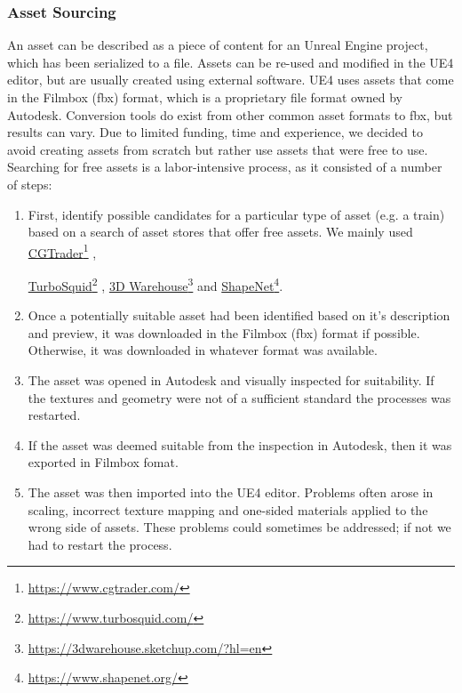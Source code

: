 \subsubsection{Asset Sourcing}
An asset can be described as a piece of content for an Unreal Engine project, which has been serialized to a file. Assets can be re-used and modified in the UE4 editor, but are usually created using external software. UE4 uses assets that come in the Filmbox (fbx) format, which is a proprietary file format owned by Autodesk. Conversion tools do exist from other common asset formats to fbx, but results can vary. Due to limited funding, time and experience, we decided to avoid creating assets from scratch but rather use assets that were free to use. Searching for free assets is a labor-intensive process, as it consisted of a number of steps:
\begin{enumerate}
    \item First, identify possible candidates for a particular type of asset (e.g. a train) based on a search of asset stores that offer free assets. We mainly used \href{https://www.cgtrader.com/}{CGTrader}\footnote{\href {https://www.cgtrader.com/}{https://www.cgtrader.com/}} ,
    
    \href{https://www.turbosquid.com/}{TurboSquid}\footnote{\href {https://www.turbosquid.com/}{https://www.turbosquid.com/}}
    , 
    \href{https://3dwarehouse.sketchup.com/?hl=en}{3D Warehouse}\footnote{\href {https://3dwarehouse.sketchup.com/?hl=en}{https://3dwarehouse.sketchup.com/?hl=en}} 
    and
    \href{https://www.shapenet.org/}{ShapeNet}\footnote{\href {https://www.shapenet.org/}{https://www.shapenet.org/}}.
    
    \item Once a potentially suitable asset had been identified based on it's description and preview, it was downloaded in the Filmbox (fbx) format if possible. Otherwise, it was downloaded in whatever format was available. 
    \item The asset was opened in Autodesk  and visually inspected for suitability. If the textures and geometry were not of a sufficient standard the processes was restarted.
    \item If the asset was deemed suitable from the inspection in Autodesk, then it was exported in Filmbox fomat.
    \item The asset was then imported into the UE4 editor. Problems often arose in scaling, incorrect texture mapping and one-sided materials applied to the wrong side of assets. These problems could sometimes be addressed; if not we had to restart the process.
\end{enumerate}





